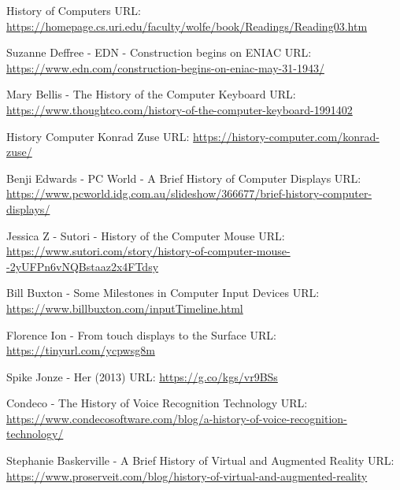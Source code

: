 \documentclass{article}
\begin{document}

\newpage
\begin{thebibliography}{00}
    
 History of Computers
\newline
URL: \url{https://homepage.cs.uri.edu/faculty/wolfe/book/Readings/Reading03.htm}

 Suzanne Deffree - EDN - Construction begins on ENIAC
\newline
URL: \url{https://www.edn.com/construction-begins-on-eniac-may-31-1943/}

 Mary Bellis - The History of the Computer Keyboard
\newline
URL: \url{https://www.thoughtco.com/history-of-the-computer-keyboard-1991402}

 History Computer Konrad Zuse
\newline
URL: \url{https://history-computer.com/konrad-zuse/}

 Benji Edwards - PC World - A Brief History of Computer Displays
\newline
URL: \url{https://www.pcworld.idg.com.au/slideshow/366677/brief-history-computer-displays/}

 Jessica Z - Sutori - History of the Computer Mouse
\newline
URL: \url{https://www.sutori.com/story/history-of-computer-mouse--2yUFPn6vNQBstaaz2x4FTdsy}

 Bill Buxton - Some Milestones in Computer Input Devices
\newline
URL: \url{https://www.billbuxton.com/inputTimeline.html}

 Florence Ion - From touch displays to the Surface
\newline
URL: \url{https://tinyurl.com/ycpwsg8m}

 Spike Jonze - Her (2013)
\newline
URL: \url{https://g.co/kgs/vr9BSs}

 Condeco - The History of Voice Recognition Technology
\newline
URL: \url{https://www.condecosoftware.com/blog/a-history-of-voice-recognition-technology/}

  Stephanie Baskerville - A Brief History of Virtual and Augmented Reality
\newline
URL: \url{https://www.proserveit.com/blog/history-of-virtual-and-augmented-reality}


\end{thebibliography}
\end{document}
